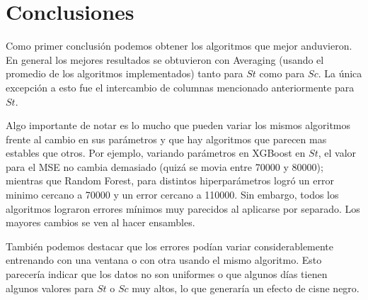 \documentclass{article}
\begin{document}
\newpage
\section{Conclusiones}
Como primer conclusión podemos obtener los algoritmos que mejor anduvieron. En general los mejores resultados se obtuvieron con Averaging (usando el promedio de los algoritmos implementados) tanto para $St$ como para $Sc$. La única excepción a esto fue el intercambio de columnas mencionado anteriormente para $St$.

Algo importante de notar es lo mucho que pueden variar los mismos algoritmos frente al cambio en sus parámetros y que hay algoritmos que parecen mas estables que otros. Por ejemplo, variando parámetros en XGBoost en $St$, el valor para el MSE no cambia demasiado (quizá se movia entre 70000 y 80000); mientras que Random Forest, para distintos hiperparámetros logró un error minimo cercano a 70000 y un error cercano a 110000.
Sin embargo, todos los algoritmos lograron errores mínimos muy parecidos al aplicarse por separado. Los mayores cambios se ven al hacer ensambles.

También podemos destacar que los errores podían variar considerablemente entrenando con una ventana o con otra usando el mismo algoritmo. Esto parecería indicar que los datos no son uniformes o que algunos días tienen algunos valores para $St$ o $Sc$ muy altos, lo que generaría un efecto de cisne negro.
\end{document}
